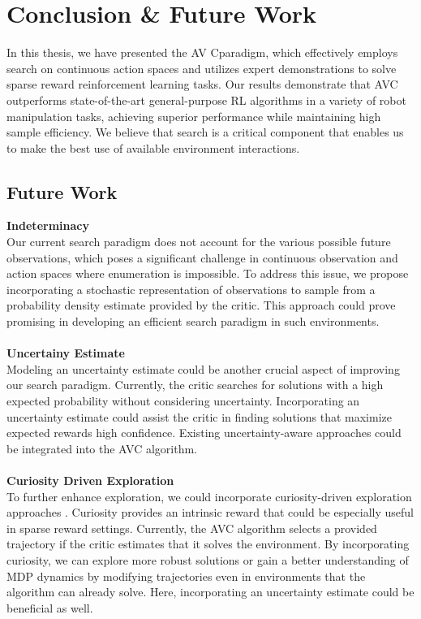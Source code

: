 
\chapter{Conclusion & Future Work}
\label{chapter:Conc_Fut}
In this thesis, we have presented the AV Cparadigm, which effectively employs search on continuous action spaces and utilizes 
expert demonstrations to solve sparse reward reinforcement learning tasks. Our results demonstrate that AVC 
outperforms state-of-the-art general-purpose RL algorithms in a variety of robot manipulation tasks, achieving superior performance 
while maintaining high sample efficiency. We believe that search is a critical component that enables us to make the best use of available 
environment interactions.

\section{Future Work}
\textbf{Indeterminacy}\\
Our current search paradigm does not account for the various possible future observations, which poses a significant challenge in 
continuous observation and action spaces where enumeration is impossible. To address this issue, we propose incorporating a stochastic 
representation of observations to sample from a probability density estimate provided by the critic. 
This approach could prove promising in developing an efficient search paradigm in such environments. \\ \\

\textbf{Uncertainy Estimate}\\
Modeling an uncertainty estimate could be another crucial aspect of improving our search paradigm. 
Currently, the critic searches for solutions with a high expected probability without considering uncertainty. 
Incorporating an uncertainty estimate could assist the critic in finding solutions that maximize expected rewards high confidence. 
Existing uncertainty-aware approaches \cite{gawlikowski2022survey,liu2022simple} 
could be integrated into the AVC algorithm.\\ \\

\textbf{Curiosity Driven Exploration}\\
To further enhance exploration, we could incorporate curiosity-driven exploration approaches \cite{pathak2017curiositydriven}. 
Curiosity provides an intrinsic reward that could be especially useful in sparse reward settings. 
Currently, the AVC algorithm selects a provided trajectory if the critic estimates that it solves the environment. By incorporating curiosity, 
we can explore more robust solutions or gain a better understanding of MDP dynamics by modifying trajectories even in environments that the 
algorithm can already solve. Here, incorporating an uncertainty estimate could be beneficial as well.